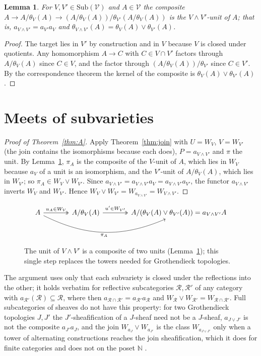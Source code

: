 \documentclass[11pt]{amsart}
\newtheorem{lem}[thm]{Lemma}
\theoremstyle{definition}
\newcommand{\Sub}{\mathrm{Sub}}
\newcommand{\sV}{\mathcal V}
\newcommand{\sR}{\mathcal R}
\begin{document}
\begin{lem}\label{lem:composite}
For $V,V'\in\Sub(\sV)$ and $A\in\sV$ the composite $A\to A/\theta_V(A)\to
(A/\theta_V(A))/\theta_{V'}(A/\theta_V(A))$ is the $V\wedge V'$-unit of $A$;
that is, $a_{V\wedge V'}=a_{V'}a_V$ and
$\theta_{V\wedge V'}(A)=\theta_V(A)\vee\theta_{V'}(A)$.
\end{lem}
\begin{proof}
The target lies in $V'$ by construction and in $V$ because $V$ is closed under
quotients. Any homomorphism $A\to C$ with $C\in V\cap V'$ factors through
$A/\theta_V(A)$ since $C\in V$, and the factor through
$(A/\theta_V(A))/\theta_{V'}$ since $C\in V'$. By the correspondence theorem the
kernel of the composite is $\theta_V(A)\vee\theta_{V'}(A)$.
\end{proof}

\section{Meets of subvarieties}\label{sec:meets}

\begin{proof}[Proof of Theorem~\ref{thm:A}]
Apply Theorem~\ref{thm:join} with $U=W_V$, $V=W_{V'}$ (the join contains the
isomorphisms because each does), $P=a_{V\wedge V'}$ and $\pi$ the unit. By
Lemma~\ref{lem:composite}, $\pi_A$ is the composite of the $V$-unit of $A$,
which lies in $W_V$ because $a_V$ of a unit is an isomorphism, and the
$V'$-unit of $A/\theta_V(A)$, which lies in $W_{V'}$; so $\pi_A\in W_V\vee
W_{V'}$. Since $a_{V\wedge V'}=a_{V\wedge V'}a_V=a_{V\wedge V'}a_{V'}$, the
functor $a_{V\wedge V'}$ inverts $W_V$ and $W_{V'}$. Hence
$W_V\vee W_{V'}=W_{a_{V\wedge V'}}=W_{V\wedge V'}$.
\end{proof}

\begin{figure}[ht]
\[
\begin{tikzcd}[column sep=large]
A\arrow[r,"u_A\in W_V",two heads]\arrow[rr,bend right=25,"\pi_A"'] & A/\theta_V(A)\arrow[r,"u'\in W_{V'}",two heads] & A/(\theta_V(A)\vee\theta_{V'}(A))=a_{V\wedge V'}A
\end{tikzcd}
\]
\caption{The unit of $V\wedge V'$ is a composite of two units (Lemma~\ref{lem:composite}); this
single step replaces the towers needed for Grothendieck topologies.}
\end{figure}

The argument uses only that each subvariety is closed under the reflections
into the other; it holds verbatim for reflective subcategories $\sR,\sR'$ of
any category with $a_{\sR'}(\sR)\subseteq\sR$, where then
$a_{\sR\cap\sR'}=a_{\sR'}a_{\sR}$ and $W_{\sR}\vee W_{\sR'}=W_{\sR\cap\sR'}$.
Full subcategories of sheaves do not have this property: for two Grothendieck
topologies $J,J'$ the $J'$-sheafification of a $J$-sheaf need not be a
$J$-sheaf, $a_{J\vee J'}$ is not the composite $a_{J'}a_J$, and the join
$W_{a_J}\vee W_{a_{J'}}$ is the class $W_{a_{J\vee J'}}$ only when a tower of
alternating constructions reaches the join sheafification, which it does for
finite categories \cite{Finitejoin} and does not on the poset $\mathbb N$
\cite[Thm.~7.1]{Topjoin}.
\end{document}

